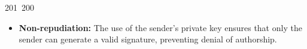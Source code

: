 201~200~\documentclass{article}
\begin{document}
\begin{itemize}
	                                                                                                                                                                                                                                                                                                	                                                                                                                                        	    	                                                                                                	                                                                                                                                                                                                                                                                                                                                	                                                                        	                                                                        	                                                                                                                                        	                                                                                                                                                                                                                        	                                                                                                                            	                                                                	                                                                                \item \textbf{Non-repudiation:} The use of the sender's private key ensures that only the sender can generate a valid signature, preventing denial of authorship.

\end{itemize}
\end{document}
